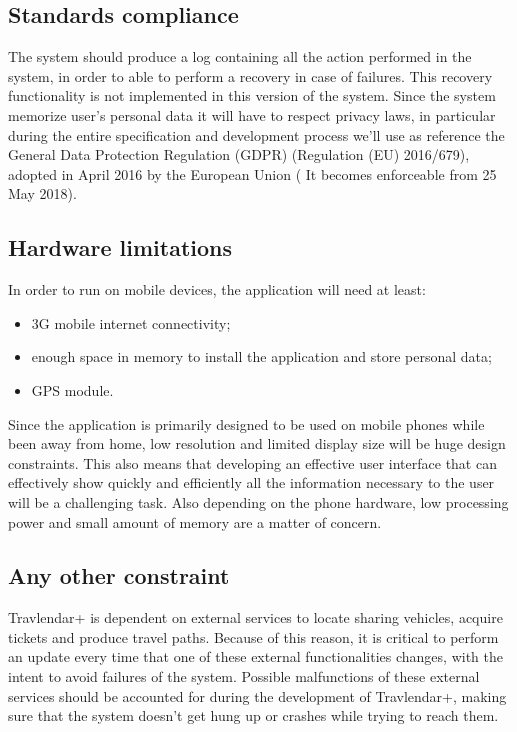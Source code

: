 \subsection{Standards compliance}
\label{subsect:Standards compliance}
	The system should produce a log containing all the action performed in the system, in order to able to perform a recovery in case of failures.
	\newline
	This recovery functionality is not implemented in this version of the system.
	\newline 
	Since the system memorize user's personal data it will have to respect privacy laws, in particular during the entire specification and development process we'll use as reference the General Data Protection Regulation (GDPR) (Regulation (EU) 2016/679), adopted in April 2016 by the European Union ( It becomes enforceable from 25 May 2018).
\subsection{Hardware limitations}
\label{subsect:Hardware limitations}
	In order to run on mobile devices, the application will need at least:
	\begin{itemize}
		\item 3G mobile internet connectivity;
		\item enough space in memory to install the application and store personal data;
		\item GPS module.
	\end{itemize}
	Since the application is primarily designed to be used on mobile phones while been away from home, low resolution and limited display size will be huge design constraints.
	\newline
	This also means that developing an effective user interface that can effectively show quickly and efficiently all the information necessary to the user will be a challenging task.
	\newline
	Also depending on the phone hardware, low processing power and small amount of memory are a matter of concern.

\subsection{Any other constraint}
\label{subsect:Any other constraint}
	Travlendar+ is dependent on external services to locate sharing vehicles, acquire tickets and produce travel paths. Because of this reason, it is critical to perform an update every time that one of these external functionalities changes, with the intent to avoid failures of the system.
	\newline
	Possible malfunctions of these external services should be accounted for during the development of Travlendar+, making sure that the system doesn't get hung up or crashes while trying to reach them.